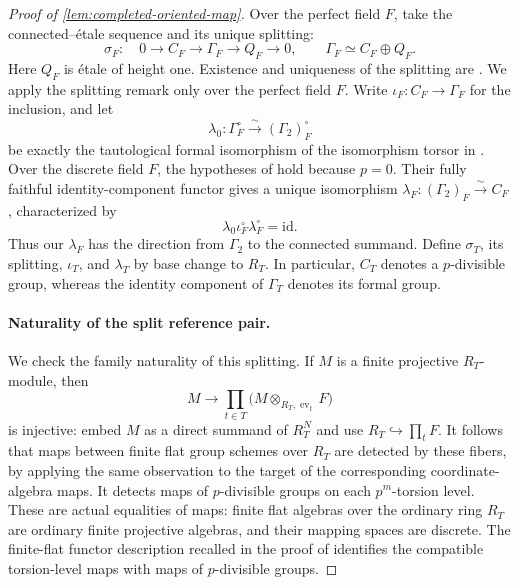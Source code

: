 \begin{proof}[Proof of \cref{lem:completed-oriented-map}]
Over the perfect field \(F\), take the connected--étale sequence and its
unique splitting:
\[
 \sigma_F:\quad
 0\longrightarrow C_F\longrightarrow\Gamma_F
 \longrightarrow Q_F\longrightarrow0,
 \qquad \Gamma_F\simeq C_F\oplus Q_F .
\]
Here \(Q_F\) is étale of height one. Existence and uniqueness of the
splitting are
\cite[Proposition~2.5.20 and Remark~2.5.24]{LurieEllipticII2018}.
We apply the splitting remark only over the perfect field \(F\).
Write \(\iota_F:C_F\to\Gamma_F\) for the inclusion, and let
\[
 \lambda_0:\Gamma_F^\circ\xrightarrow{\sim}(\Gamma_2)_F^\circ
\]
be exactly the tautological formal isomorphism of the isomorphism torsor
in \cite[Example~4.6.3]{BMR2026}. Over the discrete field \(F\), the
hypotheses of
\cite[Theorem~2.3.12 and Corollary~2.3.13]{LurieEllipticII2018} hold because
\(p=0\). Their fully faithful identity-component functor gives a unique
isomorphism
\(\lambda_F:(\Gamma_2)_F\xrightarrow{\sim}C_F\), characterized by
\[
 \lambda_0\iota_F^\circ\lambda_F^\circ=\mathrm{id}.
\]
Thus our \(\lambda_F\) has the direction from \(\Gamma_2\) to the
connected summand. Define \(\sigma_T\), its splitting, \(\iota_T\), and
\(\lambda_T\) by base change to \(R_T\). In particular, \(C_T\) denotes
a \(p\)-divisible group, whereas the identity component of \(\Gamma_T\) denotes its formal group.

\paragraph{Naturality of the split reference pair.}
We check the family naturality of this splitting. If \(M\) is a finite
projective \(R_T\)-module, then
\[
 M\longrightarrow
 \prod_{t\in T}\bigl(M\otimes_{R_T,\operatorname{ev}_t}F\bigr)
\]
is injective: embed \(M\) as a direct summand of \(R_T^N\) and use
\(R_T\hookrightarrow\prod_tF\). It follows that maps between finite flat
group schemes over \(R_T\) are detected by these fibers, by applying the
same observation to the target of the corresponding coordinate-algebra
maps. It detects maps of \(p\)-divisible groups on each \(p^m\)-torsion
level. These are actual equalities of maps: finite flat algebras over the
ordinary ring \(R_T\) are ordinary finite projective algebras, and their
mapping spaces are discrete. The finite-flat functor description recalled
in the proof of \cite[Proposition~2.5.20]{LurieEllipticII2018} identifies
the compatible torsion-level maps with maps of \(p\)-divisible groups.


\end{proof}
